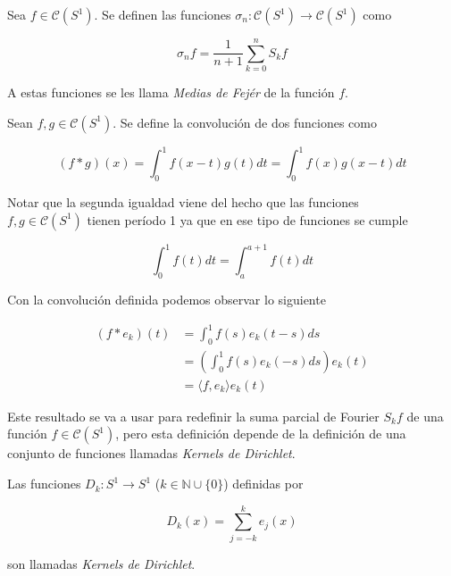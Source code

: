 \begin{definicion}
	Sea $f \in \mathcal{C}(S^1)$. Se definen las funciones $\sigma_n: \mathcal{C}(S^1) \rightarrow \mathcal{C}(S^1)$ como
	
	\begin{equation}
		\sigma_n f = \frac{1}{n+1} \sum_{k=0}^{n} S_k f
	\end{equation}
	
	A estas funciones se les llama \textit{Medias de Fejér} de la función $f$.
\end{definicion}

\begin{definicion}
	Sean $f,g \in \mathcal{C}(S^1)$. Se define la convolución de dos funciones como
	
	\begin{equation}
		(f*g)(x) = \int_{0}^{1} f(x-t)g(t)dt = \int_{0}^{1} f(x)g(x-t)dt
	\end{equation}
\end{definicion}

Notar que la segunda igualdad viene del hecho que las funciones\\
 $f,g \in \mathcal{C}(S^1)$ tienen período 1 ya que en ese tipo de funciones se cumple

\begin{equation}
	\int_{0}^{1} f(t)dt = \int_{a}^{a+1} f(t)dt
\end{equation}

Con la convolución definida podemos observar lo siguiente

\begin{align}
	(f*e_k)(t) &= \int_{0}^{1} f(s)e_k(t-s)ds\\
	&= \left( \int_{0}^{1} f(s) e_k(-s)ds \right) e_k(t)\\
	&= \langle f,e_k \rangle e_k(t)
\end{align}

Este resultado se va a usar para redefinir la suma parcial de Fourier $S_k f$ de una función $f \in \mathcal{C}(S^1)$, pero esta definición depende de la definición de una conjunto de funciones llamadas \textit{Kernels de Dirichlet}.

\begin{definicion}
	Las funciones $D_k: S^1 \rightarrow S^1$ ($k \in \mathbb{N} \cup \{0\}$) definidas por
	
	\begin{equation}
		D_k(x) = \sum_{j=-k}^{k} e_j(x)
	\end{equation}
	
	son llamadas \textit{Kernels de Dirichlet}. 
\end{definicion}

